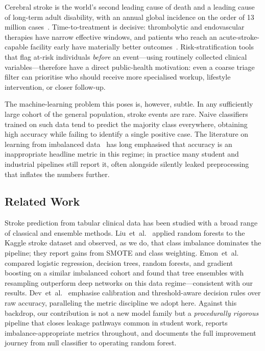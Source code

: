 \documentclass[pdflatex,sn-basic,Numbered]{sn-jnl}
\theoremstyle{thmstyleone}
\theoremstyle{thmstyletwo}
\theoremstyle{thmstylethree}
\begin{document}
Cerebral stroke is the world's second leading cause of death and a leading
cause of long-term adult disability, with an annual global incidence on the
order of 13 million cases~\cite{gbd-stroke}. Time-to-treatment is decisive:
thrombolytic and endovascular therapies have narrow effective windows, and
patients who reach an acute-stroke-capable facility early have materially
better outcomes~\cite{goyal-thrombectomy}. Risk-stratification tools that
flag at-risk individuals \emph{before} an event---using routinely collected
clinical variables---therefore have a direct public-health motivation:
even a coarse triage filter can prioritise who should receive more
specialised workup, lifestyle intervention, or closer follow-up.

The machine-learning problem this poses is, however, subtle. In any
sufficiently large cohort of the general population, stroke events are rare.
Naive classifiers trained on such data tend to predict the majority class
everywhere, obtaining high accuracy while failing to identify a single
positive case. The literature on learning from imbalanced
data~\cite{imbalanced-survey,chawla-smote-review} has long emphasised that
accuracy is an inappropriate headline metric in this regime; in practice
many student and industrial pipelines still report it, often alongside
silently leaked preprocessing that inflates the numbers further.

\subsection{Related Work}\label{sec:related}
Stroke prediction from tabular clinical data has been studied with a broad
range of classical and ensemble methods. Liu~et~al.~\cite{liu-stroke-rf}
applied random forests to the Kaggle stroke dataset and observed, as we do,
that class imbalance dominates the pipeline; they report gains from SMOTE
and class weighting. Emon~et~al.~\cite{emon-stacked-stroke} compared
logistic regression, decision trees, random forests, and gradient boosting
on a similar imbalanced cohort and found that tree ensembles with resampling
outperform deep networks on this data regime---consistent with our
results. Dev~et~al.~\cite{dev-stroke} emphasise calibration and
threshold-aware decision rules over raw accuracy, paralleling the metric
discipline we adopt here. Against this backdrop, our contribution is not a
new model family but a \emph{procedurally rigorous} pipeline that closes
leakage pathways common in student work, reports imbalance-appropriate
metrics throughout, and documents the full improvement journey from null
classifier to operating random forest.
\end{document}
